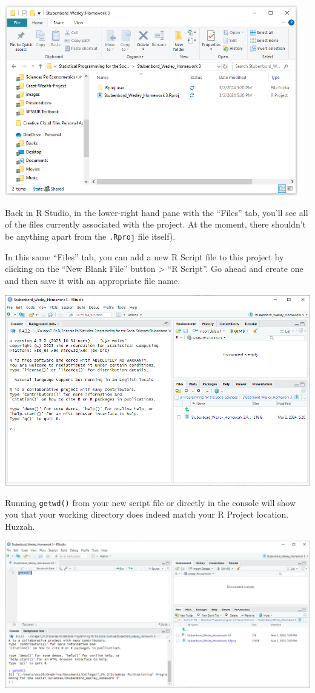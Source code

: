 \documentclass[
  letterpaper,
]{book}
\begin{document}
\includegraphics[width=5.03125in,height=\textheight]{images/R-Project-Folder.PNG}

Back in R Studio, in the lower-right hand pane with the ``Files'' tab,
you'll see all of the files currently associated with the project. At
the moment, there shouldn't be anything apart from the \texttt{.Rproj}
file itself).

In this same ``Files'' tab, you can add a new R Script file to this
project by clicking on the ``New Blank File'' button \textgreater{} ``R
Script''. Go ahead and create one and then save it with an appropriate
file name.

\includegraphics{images/R-Project-RStudio-Window.PNG}

Running \texttt{getwd()} from your new script file or directly in the
console will show you that your working directory does indeed match your
R Project location. Huzzah.

\includegraphics{images/R-project-getwd.PNG}
\end{document}

